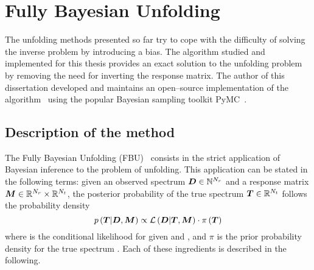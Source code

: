 \section{Fully Bayesian Unfolding}
\label{sec:fbu}

The unfolding methods presented so far try to cope with the difficulty
of solving the inverse problem by introducing a bias. The algorithm
studied and implemented for this thesis provides an exact solution to
the unfolding problem by removing the need for inverting the response
matrix. The author of this dissertation developed and maintains an
open--source implementation of the algorithm~\cite{pyfbu} using the
popular Bayesian sampling toolkit
PyMC~\cite{Patil:Huard:Fonnesbeck:2010:JSSOBK:v35i04}. 

\subsection{Description of the method}

The Fully Bayesian Unfolding (FBU)~\cite{fbu} consists in the strict
application of Bayesian inference to the problem of unfolding. This
application can be stated in the following terms: given an observed
spectrum $\boldsymbol{D}\in\mathbb{N}^{N_r}$ and a response matrix
$\boldsymbol{M}\in\mathbb{R}{}^{N_r}\times{}\mathbb{R}{}^{N_t}$, the posterior
probability of the true spectrum $\boldsymbol{T}{}\in{}\mathbb{R}{}^{N_t}$ follows
the probability density
\begin{equation}
p\left(\boldsymbol{T}{}|\boldsymbol{D}{},\boldsymbol{M}{}\right)
\propto{}
\mathcal{L}\left(\boldsymbol{D}{}|\boldsymbol{T}{},\boldsymbol{M}{}\right)
\cdot{}
\pi{}\left(\boldsymbol{T}{}\right)
\end{equation}
where \conditionalLhood{\Data{}}{\Truth{},\TrasfMatrix{}} is the
conditional likelihood for \Data{} given \Truth{} and \TrasfMatrix{},
and $\pi{}$ is the prior probability density for the true spectrum
\Truth{}.
Each of these ingredients is described in the following.

